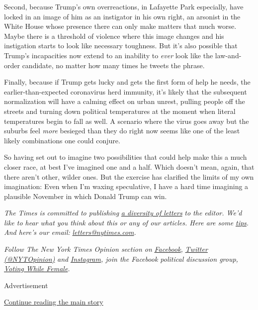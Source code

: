 Second, because Trump's own overreactions, in Lafayette Park especially,
have locked in an image of him as an instigator in his own right, an
arsonist in the White House whose presence there can only make matters
that much worse. Maybe there is a threshold of violence where this image
changes and his instigation starts to look like necessary toughness. But
it's also possible that Trump's incapacities now extend to an inability
to \emph{ever} look like the law-and-order candidate, no matter how many
times he tweets the phrase.

Finally, because if Trump gets lucky and gets the first form of help he
needs, the earlier-than-expected coronavirus herd immunity, it's likely
that the subsequent normalization will have a calming effect on urban
unrest, pulling people off the streets and turning down political
temperatures at the moment when literal temperatures begin to fall as
well. A scenario where the virus goes away but the suburbs feel
\emph{more} besieged than they do right now seems like one of the least
likely combinations one could conjure.

So having set out to imagine two possibilities that could help make this
a much closer race, at best I've imagined one and a half. Which doesn't
mean, again, that there aren't other, wilder ones. But the exercise has
clarified the limits of my own imagination: Even when I'm waxing
speculative, I have a hard time imagining a plausible November in which
Donald Trump can win.

\emph{The Times is committed to publishing}
\href{https://www.nytimes.com/2019/01/31/opinion/letters/letters-to-editor-new-york-times-women.html}{\emph{a
diversity of letters}} \emph{to the editor. We'd like to hear what you
think about this or any of our articles. Here are some}
\href{https://help.nytimes.com/hc/en-us/articles/115014925288-How-to-submit-a-letter-to-the-editor}{\emph{tips}}\emph{.
And here's our email:}
\href{mailto:letters@nytimes.com}{\emph{letters@nytimes.com}}\emph{.}

\emph{Follow The New York Times Opinion section on}
\href{https://www.facebook.com/nytopinion}{\emph{Facebook}}\emph{,}
\href{http://twitter.com/NYTOpinion}{\emph{Twitter (@NYTOpinion)}}
\emph{and}
\href{https://www.instagram.com/nytopinion/}{\emph{Instagram}}\emph{,
join the Facebook political discussion group,}
\href{https://www.facebook.com/groups/votingwhilefemale/}{\emph{Voting
While Female}}\emph{.}

Advertisement

\protect\hyperlink{after-bottom}{Continue reading the main story}

